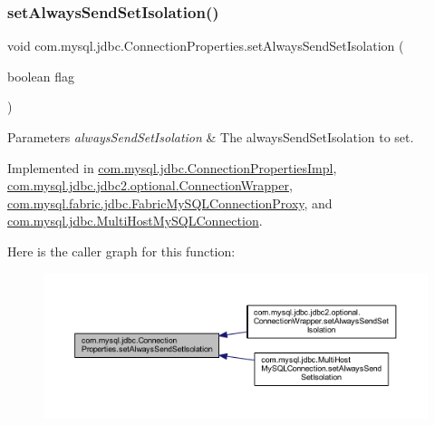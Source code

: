 \subsubsection{\texorpdfstring{set\+Always\+Send\+Set\+Isolation()}{setAlwaysSendSetIsolation()}}
{\footnotesize\ttfamily void com.\+mysql.\+jdbc.\+Connection\+Properties.\+set\+Always\+Send\+Set\+Isolation (\begin{DoxyParamCaption}\item[{boolean}]{flag }\end{DoxyParamCaption})}


\begin{DoxyParams}{Parameters}
{\em always\+Send\+Set\+Isolation} & The always\+Send\+Set\+Isolation to set. \\
\hline
\end{DoxyParams}


Implemented in \mbox{\hyperlink{classcom_1_1mysql_1_1jdbc_1_1_connection_properties_impl_afe03bb85e0693039ebca61c4ec9e3c8f}{com.\+mysql.\+jdbc.\+Connection\+Properties\+Impl}}, \mbox{\hyperlink{classcom_1_1mysql_1_1jdbc_1_1jdbc2_1_1optional_1_1_connection_wrapper_a622e428378e682ed73e80bb82717478c}{com.\+mysql.\+jdbc.\+jdbc2.\+optional.\+Connection\+Wrapper}}, \mbox{\hyperlink{classcom_1_1mysql_1_1fabric_1_1jdbc_1_1_fabric_my_s_q_l_connection_proxy_a9bd6f9eab9168c6a2c5914223f6e6b95}{com.\+mysql.\+fabric.\+jdbc.\+Fabric\+My\+S\+Q\+L\+Connection\+Proxy}}, and \mbox{\hyperlink{classcom_1_1mysql_1_1jdbc_1_1_multi_host_my_s_q_l_connection_af0ef05e04bfe22b5ac3e8108ea2bc3cc}{com.\+mysql.\+jdbc.\+Multi\+Host\+My\+S\+Q\+L\+Connection}}.

Here is the caller graph for this function\+:\nopagebreak
\begin{figure}[H]
\begin{center}
\leavevmode
\includegraphics[width=350pt]{interfacecom_1_1mysql_1_1jdbc_1_1_connection_properties_a009faf68759b3c9b1c03a15abeff987c_icgraph}
\end{center}
\end{figure}
\mbox{\label{interfacecom_1_1mysql_1_1jdbc_1_1_connection_properties_ac22dc46adecba26efb43a6fdc239e292}} 

